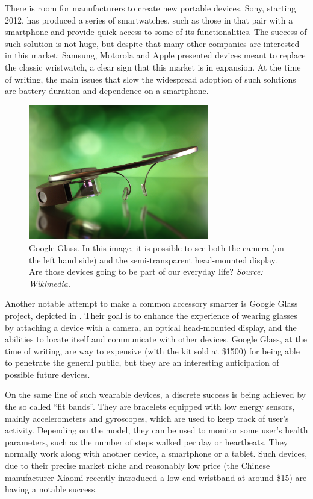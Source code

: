 \documentclass[12pt,a4paper,twoside,openright]{book}
\begin{document}
There is room for manufacturers to create new portable devices.
%
Sony, starting 2012, has produced a series of smartwatches, such as those in  that pair with a smartphone and provide quick access to some of its functionalities.
%
The success of such solution is not huge, but despite that many other companies are interested in this market: Samsung, Motorola and Apple presented devices meant to replace the classic wristwatch, a clear sign that this market is in expansion.
%
At the time of writing, the main issues that slow the widespread adoption of such solutions are battery duration and dependence on a smartphone.

\begin{figure}
	\centering
	\includegraphics[width=0.7\textwidth]{img/gglass}
	\caption[Google Glass]{Google Glass. In this image, it is possible to see both the camera (on the left hand side) and the semi-transparent head-mounted display. Are those devices going to be part of our everyday life? \emph{Source: Wikimedia.}}
	\label{img:gglass}
\end{figure}

Another notable attempt to make a common accessory smarter is Google Glass project, depicted in .
%
Their goal is to enhance the experience of wearing glasses by attaching a device with a camera, an optical head-mounted display, and the abilities to locate itself and communicate with other devices.
%
Google Glass, at the time of writing, are way to expensive (with the kit sold at \$1500) for being able to penetrate the general public, but they are an interesting anticipation of possible future devices.

On the same line of such wearable devices, a discrete success is being achieved by the so called ``fit bands''.
%
They are bracelets equipped with low energy sensors, mainly accelerometers and gyroscopes, which are used to keep track of user's activity.
%
Depending on the model, they can be used to monitor some user's health parameters, such as the number of steps walked per day or heartbeats.
%
They normally work along with another device, a smartphone or a tablet.
%
Such devices, due to their precise market niche and reasonably low price (the Chinese manufacturer Xiaomi recently introduced a low-end wristband at around \$15) are having a notable success.
\end{document}
